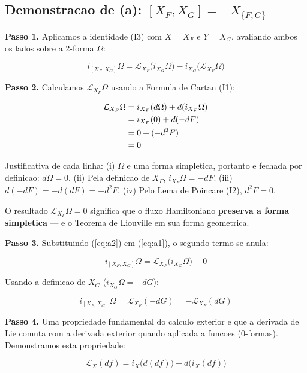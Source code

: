 \documentclass[12pt,a4paper,oneside]{article}
\begin{document}
\subsection*{Demonstracao de (a): $[X_F,X_G] = -X_{\{F,G\}}$}

\textbf{Passo 1.} Aplicamos a identidade (I3) com $X=X_F$ e $Y=X_G$,
avaliando ambos os lados sobre a 2-forma $\Omega$:

\begin{equation}\label{eq:a1}
i_{[X_F,X_G]}\Omega = \mathcal{L}_{X_F}\big(i_{X_G}\Omega\big) -
i_{X_G}\big(\mathcal{L}_{X_F}\Omega\big)
\end{equation}

\textbf{Passo 2.} Calculamos $\mathcal{L}_{X_F}\Omega$ usando a Formula de
Cartan (I1):

\begin{align}
\mathcal{L}_{X_F}\Omega &= i_{X_F}(d\Omega) + d(i_{X_F}\Omega) \notag\\
&= i_{X_F}(0) + d(-dF) \notag\\
&= 0 + (-d^2F) \notag\\
&= 0 \label{eq:a2}
\end{align}

Justificativa de cada linha: (i) $\Omega$ e uma forma simpletica, portanto
e fechada por definicao: $d\Omega = 0$. (ii) Pela definicao de $X_F$,
$i_{X_F}\Omega = -dF$. (iii) $d(-dF) = -d(dF) = -d^2F$. (iv) Pelo Lema de
Poincare (I2), $d^2F = 0$.

O resultado $\mathcal{L}_{X_F}\Omega = 0$ significa que o fluxo Hamiltoniano
\textbf{preserva a forma simpletica} — e o Teorema de Liouville em sua forma
geometrica.

\textbf{Passo 3.} Substituindo (\ref{eq:a2}) em (\ref{eq:a1}), o segundo
termo se anula:

$$i_{[X_F,X_G]}\Omega = \mathcal{L}_{X_F}\big(i_{X_G}\Omega\big) - 0$$

Usando a definicao de $X_G$ ($i_{X_G}\Omega = -dG$):

\begin{equation}\label{eq:a3}
i_{[X_F,X_G]}\Omega = \mathcal{L}_{X_F}(-dG) = -\mathcal{L}_{X_F}(dG)
\end{equation}

\textbf{Passo 4.} Uma propriedade fundamental do calculo exterior e que a
derivada de Lie comuta com a derivada exterior quando aplicada a funcoes
(0-formas). Demonstramos esta propriedade:

$$\mathcal{L}_X(df) = i_X\big(d(df)\big) + d\big(i_X(df)\big)$$
\end{document}
